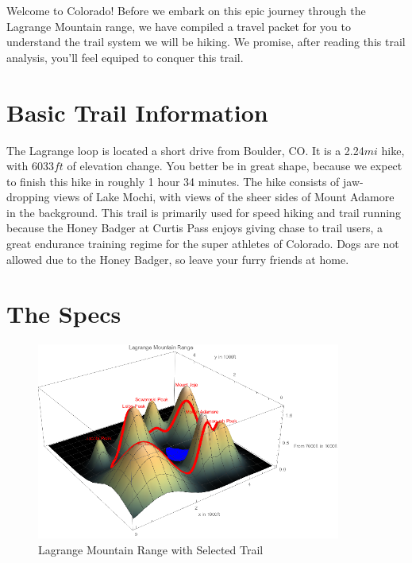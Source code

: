 \documentclass[12pt]{article}   %
\theoremstyle{definition}
\numberwithin{equation}{section}
\begin{document}
\quad Welcome to Colorado! Before we embark on this epic journey through the Lagrange Mountain range, we have compiled a travel packet for you to understand the trail system we will be hiking. We promise, after reading this trail analysis, you'll feel equiped to conquer this trail.

\section{Basic Trail Information} \label{APPM2350proj01sec02}

\quad The Lagrange loop is located a short drive from Boulder, CO. It is a 2.24$mi$ hike, with 6033$ft$ of elevation change. You better be in great shape, because we expect to finish this hike in roughly 1 hour 34 minutes. The hike consists of jaw-dropping views of Lake Mochi, with views of the sheer sides of Mount Adamore in the background. This trail is primarily used for speed hiking and trail running because the Honey Badger at Curtis Pass enjoys giving chase to trail users, a great endurance training regime for the super athletes of Colorado. Dogs are not allowed due to the Honey Badger, so leave your furry friends at home.

\section{The Specs}
\label{APPM2350proj01sec03}

\begin{figure} [h]
  \centering
  \includegraphics[width=10cm]{../images/lakeCorrect.png}
  \caption{Lagrange Mountain Range with Selected Trail}
  \label{fig:7humpswithtrail}
\end{figure}
\end{document}

